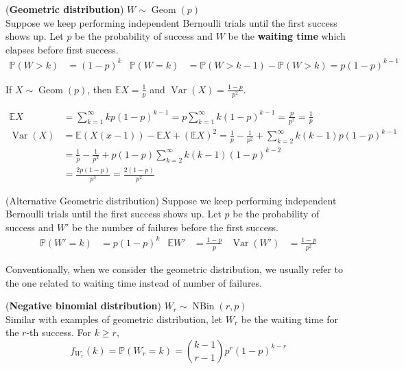 \documentclass{huhtakm-template-book}
\newcommand{\prob}{\mathbb{P}}
\newcommand{\expect}{\mathbb{E}}
\DeclareMathOperator{\NBin}{NBin}
\DeclareMathOperator{\Geom}{Geom}
\DeclareMathOperator{\Var}{Var}
\begin{document}
\newpage
\begin{eg}(\textbf{Geometric distribution}) $W\sim\Geom(p)$\\
	Suppose we keep performing independent Bernoulli trials until the first success shows up. Let $p$ be the probability of success and $W$ be the \textbf{waiting time} which elapses before first success.
	\begin{align*}
		\prob(W>k)&=(1-p)^{k} & \prob(W=k)&=\prob(W>k-1)-\prob(W>k)=p(1-p)^{k-1}
	\end{align*}
\end{eg}
\begin{thm}
	If $X\sim\Geom(p)$, then $\expect{X}=\frac{1}{p}$ and $\Var(X)=\frac{1-p}{p^{2}}$.
\end{thm}
\begin{proofing}
	\begin{align*}
		\expect{X}&=\sum_{k=1}^{\infty}kp(1-p)^{k-1}=p\sum_{k=1}^{\infty}k(1-p)^{k-1}=\frac{p}{p^{2}}=\frac{1}{p}\\
		\Var(X)&=\expect(X(x-1))-\expect{X}+(\expect{X})^{2}=\frac{1}{p}-\frac{1}{p^{2}}+\sum_{k=2}^{\infty}k(k-1)p(1-p)^{k-1}\\
		&=\frac{1}{p}-\frac{1}{p^{2}}+p(1-p)\sum_{k=2}^{\infty}k(k-1)(1-p)^{k-2}\\
		&=\frac{2p(1-p)}{p^{3}}=\frac{2(1-p)}{p^{2}}
	\end{align*}
\end{proofing}
\begin{eg}(Alternative Geometric distribution)
	Suppose we keep performing independent Bernoulli trials until the first success shows up. Let $p$ be the probability of success and $W'$ be the number of failures before the first success.
	\begin{align*}
		\prob(W'=k)&=p(1-p)^{k} & \expect{W'}&=\frac{1-p}{p} & \Var(W')&=\frac{1-p}{p^{2}}
	\end{align*}
\end{eg}
\begin{rem}
	Conventionally, when we consider the geometric distribution, we usually refer to the one related to waiting time instead of number of failures.
\end{rem}
\begin{eg}(\textbf{Negative binomial distribution}) $W_{r}\sim\NBin(r,p)$\\
	Similar with examples of geometric distribution, let $W_{r}$ be the waiting time for the $r$-th success. For $k\geq r$,
	\begin{equation*}
		f_{W_{r}}(k)=\prob(W_{r}=k)=\binom{k-1}{r-1}p^{r}(1-p)^{k-r}
	\end{equation*}
\end{eg}
\end{document}
